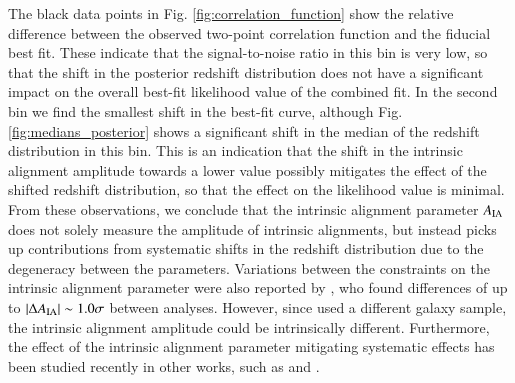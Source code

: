 \documentclass{aa}
\begin{document}
The black data points in Fig. \ref{fig:correlation_function} show the relative difference between the observed two-point correlation function and the fiducial best fit. These indicate that the signal-to-noise ratio in this bin is very low, so that the shift in the posterior redshift distribution does not have a significant impact on the overall best-fit likelihood value of the combined fit. In the second bin we find the smallest shift in the best-fit curve, although Fig. \ref{fig:medians_posterior} shows a significant shift in the median of the redshift distribution in this bin. This is an indication that the shift in the intrinsic alignment amplitude towards a lower value possibly mitigates the effect of the shifted redshift distribution, so that the effect on the likelihood value is minimal. From these observations, we conclude that the intrinsic alignment parameter $A_{\rm IA}$ does not solely measure the amplitude of intrinsic alignments, but instead picks up contributions from systematic shifts in the redshift distribution due to the degeneracy between the parameters. Variations between the constraints on the intrinsic alignment parameter were also reported by \cite{wright_som_kv450}, who found differences of up to $\left| \Delta A_{\rm IA} \right| \sim 1.0\sigma$ between analyses. However, since \cite{wright_som_kv450} used a different galaxy sample, the intrinsic alignment amplitude could be intrinsically different. Furthermore, the effect of the intrinsic alignment parameter mitigating systematic effects has been studied recently in other works, such as \cite{vanUitert18} and \cite{Efstathiou18}.
\end{document}
